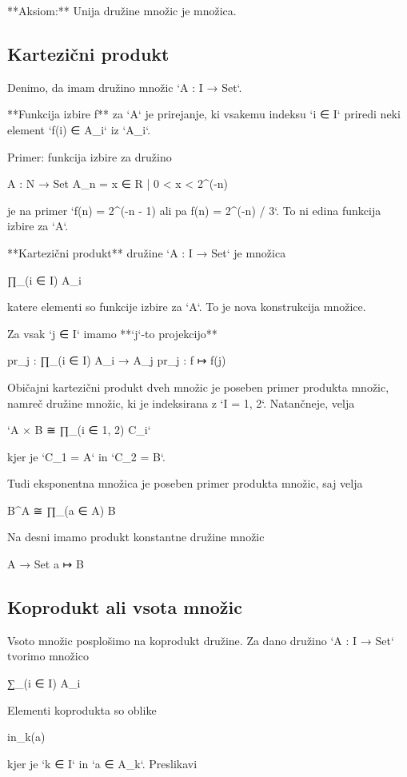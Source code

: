 **Aksiom:** Unija družine množic je množica.

\subsection{Kartezični produkt}

Denimo, da imam družino množic `A : I → Set`.

**Funkcija izbire f** za `A` je prirejanje, ki vsakemu indeksu `i ∈ I` priredi neki element
`f(i) ∈ A_i` iz `A_i`.

Primer: funkcija izbire za družino

     A : N → Set
     A_n = { x ∈ R | 0 < x < 2^(-n) }

je na primer `f(n) = 2^(-n - 1) ali pa f(n) = 2^(-n) / 3`. To ni edina funkcija izbire za `A`.

**Kartezični produkt** družine `A : I → Set` je množica

    ∏_(i ∈ I) A_i

katere elementi so funkcije izbire za `A`. To je nova konstrukcija množice.

Za vsak `j ∈ I` imamo **`j`-to projekcijo**

    pr_j :  ∏_(i ∈ I) A_i → A_j
    pr_j :  f ↦ f(j)

Običajni kartezični produkt dveh množic je poseben primer produkta množic, namreč družine
množic, ki je indeksirana z `I = {1, 2}`. Natančneje, velja

  `A × B ≅ ∏_(i ∈ {1, 2}) C_i`

  kjer je `C_1 = A` in `C_2 = B`.

Tudi eksponentna množica je poseben primer produkta množic, saj velja

    B^A ≅ ∏_(a ∈ A) B

Na desni imamo produkt konstantne družine množic

    A → Set
    a ↦ B

\subsection{Koprodukt ali vsota množic}

Vsoto množic posplošimo na koprodukt družine. Za dano družino `A : I → Set` tvorimo množico

    ∑_(i ∈ I) A_i

Elementi koprodukta so oblike

    in_k(a)

kjer je `k ∈ I` in `a ∈ A_k`. Preslikavi

